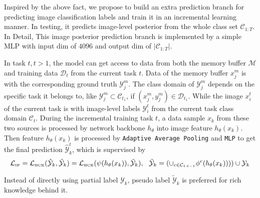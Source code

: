 Inspired by the above fact, we propose to build an extra prediction branch for predicting image classification labels and train it in an incremental learning manner. In testing, it predicts image-level posterior from the whole class set $\mathcal{C}_{1:T}$. In Detail, This image posterior prediction branch is implemented by a simple MLP with input dim of $4096$ and output dim of $\left|\mathcal{C}_{1:T}\right|$. 

In task $t, t > 1$, the model can get access to data from both the memory buffer $\mathcal{M}$ and training data $\mathcal{D}_t$ from the current task $t$. 
Data of the memory buffer $x_j^m$ is with the corresponding ground truth $\mathcal{Y}_j^{m}$. The class domain of $\mathcal{Y}_j^{m}$ depends on the specific task it belongs to, like $\mathcal{Y}_j^{m} \subset \mathcal{C}_{t_1}$, if $(x_j^m, y_j^m) \in \mathcal{D}_{t_1}$. 
While the image $x_i^t$ of the current task is with image-level labels $\mathcal{Y}_i^t$ from the current task class domain $\mathcal{C}_{t}$. 
During the incremental training task $t$, a data sample $x_k$ from these two sources is processed by network backbone $h_{\theta}$ into image feature $h_{\theta}(x_k)$. Then feature $h_{\theta}(x_k)$ is processed by \texttt{Adaptive Average Pooling} and \texttt{MLP} to get the final prediction $\hat{\mathcal{Y}}_k^t$, which is supervised by
\begin{equation}
    \mathcal{L}_{\text{\tiny IP}} = \mathcal{L}_{\text{\tiny BCE}}(\hat{\mathcal{Y}}_k, \tilde{\mathcal{Y}}_k) = \mathcal{L}_{\text{\tiny BCE}}(\psi(h_\theta(x_k)), \tilde{\mathcal{Y}}_k), ~~\tilde{\mathcal{Y}}_k = (\cup_{c\in\mathcal{C}_{1:t-1}}\phi^c(h_\theta(x_k))))\cup \mathcal{Y}_k
\end{equation}

Instead of directly using partial label $\mathcal{Y}_k$, pseudo label $\tilde{\mathcal{Y}}_k$ is preferred for rich knowledge behind it. 

